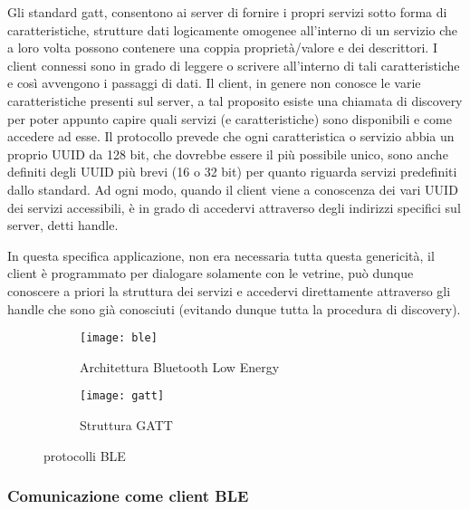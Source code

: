 Gli standard gatt, consentono ai server di fornire i propri servizi sotto forma di caratteristiche, strutture dati logicamente omogenee all'interno di un servizio che a loro volta possono contenere una coppia propriet\`a/valore e dei descrittori. I client connessi sono in grado di leggere o scrivere all'interno di tali caratteristiche e cos\`i avvengono i passaggi di dati. Il client, in genere non conosce le varie caratteristiche presenti sul server, a tal proposito esiste una chiamata di discovery per poter appunto capire quali servizi (e caratteristiche) sono disponibili e come accedere ad esse. Il protocollo prevede che ogni caratteristica o servizio abbia un proprio UUID da 128 bit, che dovrebbe essere il pi\`u possibile unico, sono anche definiti degli UUID pi\`u brevi (16 o 32 bit) per quanto riguarda servizi predefiniti dallo standard. Ad ogni modo, quando il client viene a conoscenza dei vari UUID dei servizi accessibili, \`e in grado di accedervi attraverso degli indirizzi specifici sul server, detti handle. 

In questa specifica applicazione, non era necessaria tutta questa genericit\`a, il client \`e programmato per dialogare solamente con le vetrine, pu\`o dunque conoscere a priori la struttura dei servizi e accedervi direttamente attraverso gli handle che sono gi\`a conosciuti (evitando dunque tutta la procedura di discovery).

\begin{figure}[ht]
  \center
  \begin{subfigure}{.65\textwidth}
    \texttt{[image: ble]}
    \caption{Architettura Bluetooth Low Energy}
  \end{subfigure}
  \hfill
  \begin{subfigure}{.25\textwidth}
    \texttt{[image: gatt]}
    \caption{Struttura GATT}
  \end{subfigure}
  \caption{protocolli BLE}
\end{figure}

\subsubsection{Comunicazione come client BLE}


